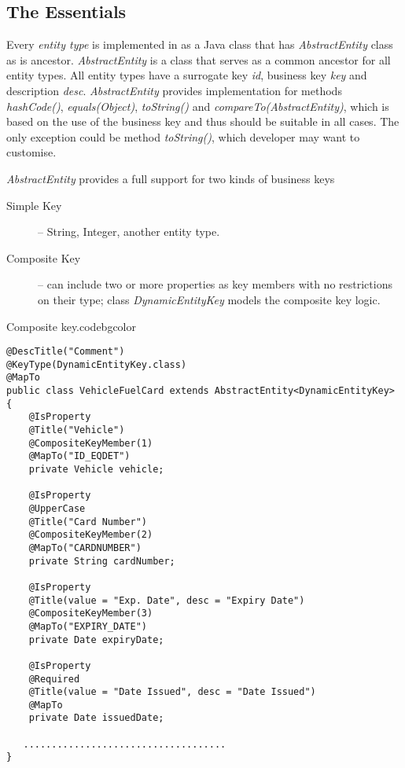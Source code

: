 \subsection{The Essentials}

  Every \emph{entity type} is implemented in as a Java class that has \emph{AbstractEntity} class as is ancestor.
  \emph{AbstractEntity} is a class that serves as a common ancestor for all entity types. 
  All entity types have a surrogate key \emph{id}, business key \emph{key} and description \emph{desc}. 
  \emph{AbstractEntity} provides implementation for methods \emph{hashCode()}, \emph{equals(Object)}, \emph{toString()} and \emph{compareTo(AbstractEntity)}, which is based on the use of the business key and thus should be suitable in all cases.
  The only exception could be method \emph{toString()}, which developer may want to customise.


  \emph{AbstractEntity} provides a full support for two kinds of business keys
  \begin{description}
    \item[Simple Key] -- String, Integer, another entity type.
    \item[Composite Key] -- can include two or more properties as key members with no restrictions on their type; class \emph{DynamicEntityKey} models the composite key logic.
   \end{description}

  \begin{code}{Composite key.}{\label{lst:CompositeKey}}{codebgcolor}
    \begin{lstlisting}
@DescTitle("Comment")
@KeyType(DynamicEntityKey.class)
@MapTo
public class VehicleFuelCard extends AbstractEntity<DynamicEntityKey> {
    @IsProperty
    @Title("Vehicle")
    @CompositeKeyMember(1)
    @MapTo("ID_EQDET")
    private Vehicle vehicle;

    @IsProperty
    @UpperCase
    @Title("Card Number")
    @CompositeKeyMember(2)
    @MapTo("CARDNUMBER")
    private String cardNumber;

    @IsProperty
    @Title(value = "Exp. Date", desc = "Expiry Date")
    @CompositeKeyMember(3)
    @MapTo("EXPIRY_DATE")
    private Date expiryDate;

    @IsProperty
    @Required
    @Title(value = "Date Issued", desc = "Date Issued")
    @MapTo
    private Date issuedDate;

   ....................................
}
    \end{lstlisting}
  \end{code}


